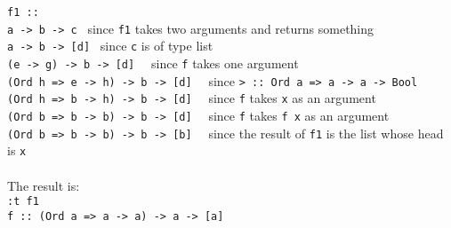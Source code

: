 \texttt{f1 ::}\\
\texttt{a -> b -> c}~ since \texttt{f1} takes two arguments and returns something\\
\texttt{a -> b -> [d]}~ since \texttt{c} is of type list\\
\texttt{(e -> g) -> b -> [d] }~ since \texttt{f} takes one argument\\
\texttt{(Ord h => e -> h) -> b -> [d] }~ since \texttt{> :: Ord a => a -> a -> Bool}\\
\texttt{(Ord h => b -> h) -> b -> [d] }~ since \texttt{f} takes \texttt{x} as an argument\\
\texttt{(Ord b => b -> b) -> b -> [d] }~ since \texttt{f} takes \texttt{f x} as an argument\\
\texttt{(Ord b => b -> b) -> b -> [b] }~ since the result of \texttt{f1} is the list whose head is \texttt{x}\\
\\
The result is:\\
\texttt{:t f1}\\
\texttt{f :: (Ord a => a -> a) -> a -> [a]}\\
